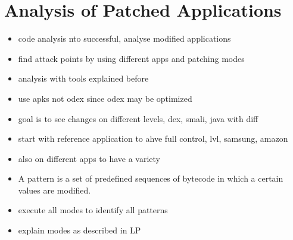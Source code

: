 \section{Analysis of Patched Applications} \label{section:luckypatcher-operation}
\begin{itemize}
  \item code analysis nto successful, analyse modified applications
  \item find attack points by using different apps and patching modes
  \item analysis with tools explained before
  \item use apks not odex since odex may be optimized
  \item goal is to see changes on different levels, dex, smali, java with diff
  \item start with reference application to ahve full control, lvl, samsung, amazon
  \item also on different apps to have a variety
  \item A pattern is a set of predefined sequences of bytecode in which a certain values are modified.
  \item execute all modes to identify all patterns
  \item explain modes as described in LP
\end{itemize}
